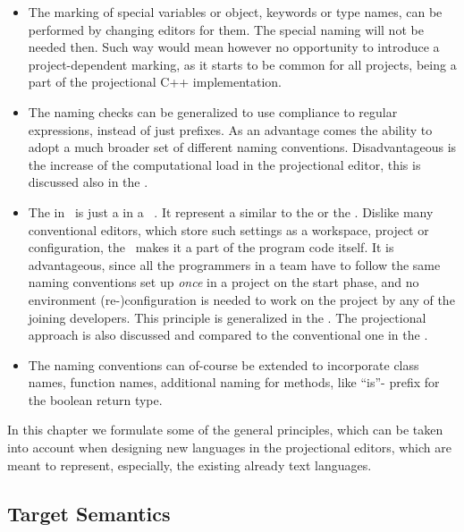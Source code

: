   \begin{itemize}
   \item  The marking of special variables or object, keywords or type names, can be performed by changing editors for them. The special
naming will not be needed then. Such way would mean however no opportunity to introduce a project-dependent marking, as it starts to be
common for all projects, being a part of the projectional C++ implementation.

\item The naming checks can be generalized to use compliance to regular expressions, instead of just prefixes. As an advantage comes the
ability to adopt a much broader set of different naming conventions. Disadvantageous is the increase
of the computational load in the projectional editor, this is discussed also in the .

\item The  in \pcpp\ is just a  in a \jbmps\ . It represent a similar 
 to the  or the  . 
Dislike many conventional editors, which store such settings as a workspace, project or  configuration, the
\pcpp\ makes it a part of the program code itself. It is advantageous, since all the programmers in a team have to follow the 
same naming conventions set up \emph{once} in a project on the start phase, and no environment (re-)configuration is needed to work on the project by
any of the joining developers. This principle is generalized in the . 
The projectional approach is also discussed and compared to the conventional one in the .

\item The naming conventions can of-course be extended to incorporate class names, function names, additional naming for methods,
like ``is''- prefix for the boolean return type. 


  \end{itemize}

 


In this chapter we formulate some of the general principles, which can be taken into
account when designing new languages in the projectional editors, which are meant to represent, especially,
the existing already text languages.

\subsection{Target Semantics}

